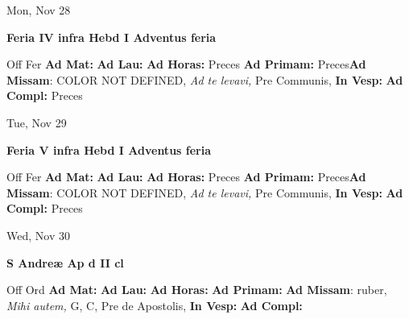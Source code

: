 \documentclass[10pt]{memoir}
\begin{document}
\begin{center}
\begin{minipage}{3.5in}
\vspace{2em}
\begin{center}Mon, Nov 28
\end{center}
\textbf{ \large Feria IV infra Hebd I Adventus
\textnormal{\normalsize feria}}

\begin{justify}Off Fer
\textbf{Ad Mat: }
\textbf{Ad Lau: }
\textbf{Ad Horas: }Preces
\textbf{Ad Primam: }Preces\textbf{Ad Missam}: COLOR NOT DEFINED, \textit{Ad te levavi,} Pre Communis, 
\textbf{In Vesp: }
\textbf{Ad Compl: }Preces
\end{justify}
\end{minipage}
\end{center}

\begin{center}
\begin{minipage}{3.5in}
\vspace{2em}
\begin{center}Tue, Nov 29
\end{center}
\textbf{ \large Feria V infra Hebd I Adventus
\textnormal{\normalsize feria}}

\begin{justify}Off Fer
\textbf{Ad Mat: }
\textbf{Ad Lau: }
\textbf{Ad Horas: }Preces
\textbf{Ad Primam: }Preces\textbf{Ad Missam}: COLOR NOT DEFINED, \textit{Ad te levavi,} Pre Communis, 
\textbf{In Vesp: }
\textbf{Ad Compl: }Preces
\end{justify}
\end{minipage}
\end{center}

\begin{center}
\begin{minipage}{3.5in}
\vspace{2em}
\begin{center}Wed, Nov 30
\end{center}
\textbf{ \large S Andreæ Ap
\textnormal{\normalsize d II cl}}

\begin{justify}Off Ord
\textbf{Ad Mat: }
\textbf{Ad Lau: }
\textbf{Ad Horas: }
\textbf{Ad Primam: }\textbf{Ad Missam}: ruber, \textit{Mihi autem,} G, C, Pre de Apostolis, 
\textbf{In Vesp: }
\textbf{Ad Compl: }
\end{justify}
\end{minipage}
\end{center}
\end{document}

